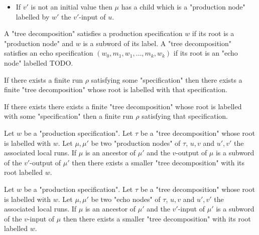 \begin{definition}
\begin{itemize}
\begin{itemize}
			\item If $v'$ is not an initial value then $\mu$ has a child which is a "production node" labelled by $w'$ the $v'$-input of $u$.
		\end{itemize}
	\end{itemize}
\end{definition}

\begin{definition}
	A "tree decomposition" satisfies a production specification $w$ if its root is a "production node" and $w$ is a subword of its label.
	A "tree decomposition" satisfies an echo specification $(w_0, m_1, w_1, \ldots, m_k, w_k)$ if its root is an "echo node" labelled TODO.
\end{definition}



\begin{lemma}
	If there exists a finite run $\rho$ satisfying some "specification" then there exists a finite "tree decomposition" whose root is labelled with that specification.
\end{lemma}


\begin{lemma}
	If there exists there exists a finite "tree decomposition" whose root is labelled with some "specification" then  a finite run $\rho$ satisfying that specification.
\end{lemma}

\begin{lemma}
	Let $w$ be a "production specification".
	Let $\tau$ be a "tree decomposition" whose root is labelled with $w$.
	Let $\mu, \mu'$ be two "production nodes" of $\tau$, $u, v$ and $u', v'$ the associated local runs.
	If $\mu$ is an ancestor of $\mu'$ and the $v$-output of $\mu$ is a subword of the $v'$-output of $\mu'$ then there exists a smaller "tree decomposition" with its root labelled $w$.  
\end{lemma}

\begin{lemma}
	Let $w$ be a "production specification".
	Let $\tau$ be a "tree decomposition" whose root is labelled with $w$.
	Let $\mu, \mu'$ be two "echo nodes" of $\tau$, $u, v$ and $u', v'$ the associated local runs.
	If $\mu$ is an ancestor of $\mu'$ and the $v'$-input of $\mu'$ is a subword of the $v$-input of $\mu$ then there exists a smaller "tree decomposition" with its root labelled $w$.  
\end{lemma}



